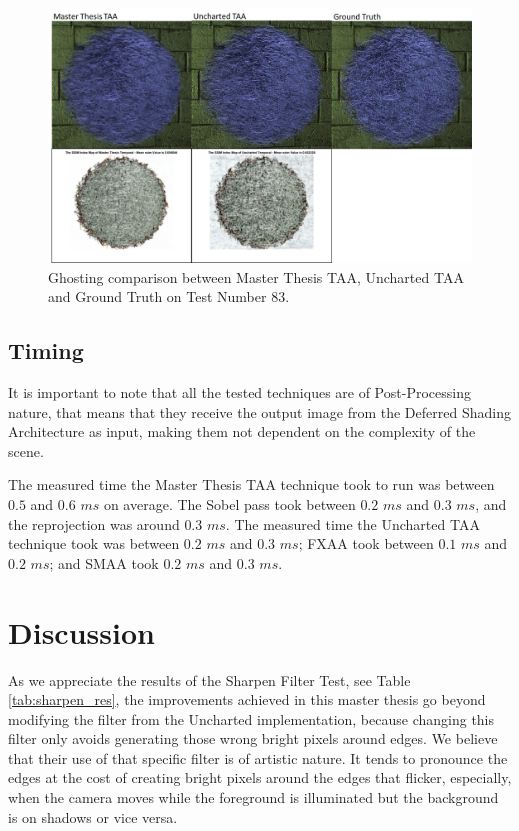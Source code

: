 \documentclass[pregrado]{tesis-usb} %
\begin{document}
\begin{figure}[H]
	\centering
	\includegraphics[scale=0.8]{images/results/hairball_ghosting_lighted.png}
	\caption{Ghosting comparison between Master Thesis TAA, Uncharted TAA and Ground Truth on Test Number 83.}\label{fig:hairball_ghosting_lighted}
\end{figure}


\subsection{Timing} \label{result_timing}
It is important to note that all the tested techniques are of Post-Processing nature, that means that they receive the output image from the Deferred Shading Architecture as input, making them not dependent on the complexity of the scene.
 
The measured time the Master Thesis TAA technique took to run was between $0.5$ and $0.6$ $ms$ on average. The Sobel pass took between $0.2$ $ms$ and $0.3$ $ms$, and the reprojection was around $0.3$ $ms$. The measured time the Uncharted TAA technique took was between $0.2$ $ms$ and $0.3$ $ms$; FXAA took between $0.1$ $ms$ and $0.2$ $ms$; and SMAA took $0.2$ $ms$ and $0.3$ $ms$.

\section{Discussion}
As we appreciate the results of the Sharpen Filter Test, see Table \ref{tab:sharpen_res}, the improvements achieved in this master thesis go beyond modifying the filter from the Uncharted implementation, because changing this filter only avoids generating those wrong bright pixels around edges. We believe that their use of that specific filter is of artistic nature. It tends to pronounce the edges at the cost of creating bright pixels around the edges that flicker, especially, when the camera moves while the foreground is illuminated but the background is on shadows or vice versa. 
\end{document}
